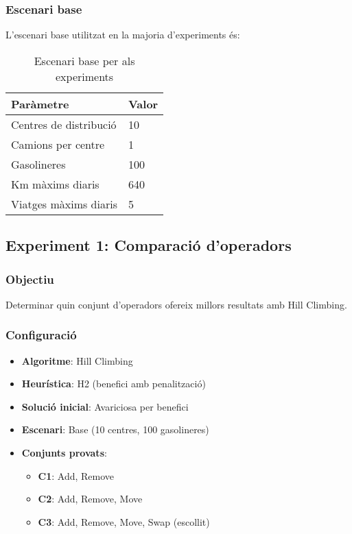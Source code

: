 \subsubsection{Escenari base}

L'escenari base utilitzat en la majoria d'experiments és:

\begin{table}[H]
\centering
\begin{tabular}{@{}ll@{}}
\toprule
\textbf{Paràmetre} & \textbf{Valor} \\
\midrule
Centres de distribució & 10 \\
Camions per centre & 1 \\
Gasolineres & 100 \\
Km màxims diaris & 640 \\
Viatges màxims diaris & 5 \\
\bottomrule
\end{tabular}
\caption{Escenari base per als experiments}
\label{tab:escenari-base}
\end{table}

\subsection{Experiment 1: Comparació d'operadors}

\subsubsection{Objectiu}
Determinar quin conjunt d'operadors ofereix millors resultats amb Hill Climbing.

\subsubsection{Configuració}
\begin{itemize}
    \item \textbf{Algoritme}: Hill Climbing
    \item \textbf{Heurística}: H2 (benefici amb penalització)
    \item \textbf{Solució inicial}: Avariciosa per benefici
    \item \textbf{Escenari}: Base (10 centres, 100 gasolineres)
    \item \textbf{Conjunts provats}:
    \begin{itemize}
        \item \textbf{C1}: Add, Remove
        \item \textbf{C2}: Add, Remove, Move
        \item \textbf{C3}: Add, Remove, Move, Swap (escollit)
    \end{itemize}
\end{itemize}

